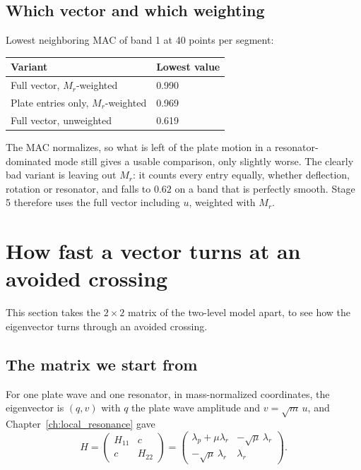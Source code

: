 \subsection{Which vector and which weighting}
Lowest neighboring MAC of band 1 at 40 points per segment:

\begin{center}
\begin{tabular}{|l|l|}
\hline
Variant & Lowest value \\
\hline
Full vector, $M_r$-weighted & 0.990 \\
Plate entries only, $M_r$-weighted & 0.969 \\
Full vector, unweighted & 0.619 \\
\hline
\end{tabular}
\end{center}

The MAC normalizes, so what is left of the plate motion in a resonator-dominated mode
still gives a usable comparison, only slightly worse. The clearly bad variant is
leaving out $M_r$: it counts every entry equally, whether deflection, rotation or
resonator, and falls to $0.62$ on a band that is perfectly smooth. Stage 5 therefore
uses the full vector including $u$, weighted with $M_r$.

\section{How fast a vector turns at an avoided crossing}
\label{sec:mixing_angle}

This section takes the $2\times 2$ matrix of the two-level model apart, to see how
the eigenvector turns through an avoided crossing.

\subsection{The matrix we start from}
For one plate wave and one resonator, in mass-normalized coordinates, the eigenvector
is $(q, v)$ with $q$ the plate wave amplitude and $v = \sqrt{m}\,u$, and
Chapter~\ref{ch:local_resonance} gave
\begin{equation}
  H = \begin{pmatrix} H_{11} & c \\ c & H_{22} \end{pmatrix}
    = \begin{pmatrix} \lambda_p + \mu\lambda_r & -\sqrt{\mu}\,\lambda_r \\ -\sqrt{\mu}\,\lambda_r & \lambda_r \end{pmatrix} .
\end{equation}

